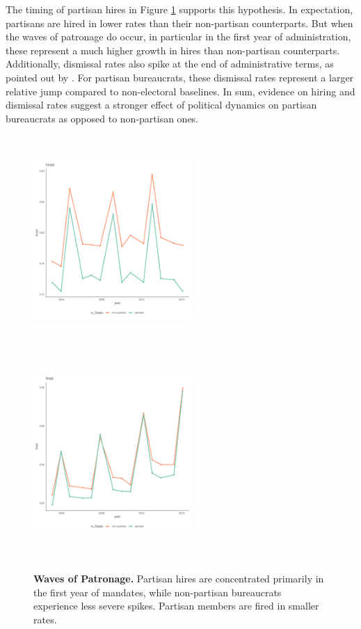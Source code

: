 The timing of partisan hires in Figure \ref{fig:turnover} supports this hypothesis. In expectation, partisans are hired in lower rates than their non-partisan counterparts. But when the waves of patronage do occur, in particular in the first year of administration, these represent a much higher growth in hires than non-partisan counterparts. Additionally, dismissal rates also spike at the end of administrative terms, as pointed out by \citet{toral_patronage_2018}. For partisan bureaucrats, these dismissal rates represent a larger relative jump compared to non-electoral baselines. In sum, evidence on hiring and dismissal rates suggest a stronger effect of political dynamics on partisan bureaucrats as opposed to non-partisan ones.

\begin{figure}[H]
    \includegraphics[width = 6cm, height = 8cm]{chapters/chapter_3/figures/turnover/plot_hired.pdf}
    \includegraphics[width = 6cm, height = 8cm]{chapters/chapter_3/figures/turnover/plot_fired.pdf}
    \caption{\textbf{Waves of Patronage.} Partisan hires are concentrated primarily in the first year of mandates, while non-partisan bureaucrats experience less severe spikes. Partisan members are fired in smaller rates.}
    \label{fig:turnover}
\end{figure}

